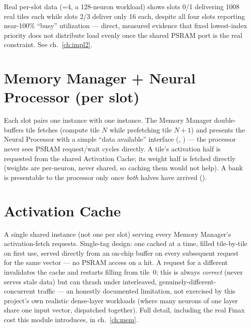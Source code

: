 \begin{fnnote}
Real per-slot data (=4, a 128-neuron workload) shows
slots 0/1 delivering 1008 real tiles each while slots 2/3 deliver only
16 each, despite all four slots reporting near-100\% ``busy''
utilization --- direct, measured evidence that fixed lowest-index
priority does not distribute load evenly once the shared PSRAM port is
the real constraint. See ch.~\ref{ch:impl2}.
\end{fnnote}

\section{Memory Manager + Neural Processor (per slot)}
Each slot pairs one  instance with one
 instance. The Memory Manager double-buffers
tile fetches (compute tile $N$ while prefetching tile $N{+}1$) and
presents the Neural Processor with a simple ``data available''
interface (, ) --- the
processor never sees PSRAM request/wait cycles directly. A tile's
activation half is requested from the shared Activation Cache; its
weight half is fetched directly (weights are per-neuron, never shared,
so caching them would not help). A bank is presentable to the processor
only once \emph{both} halves have arrived
().

\section{Activation Cache}
\label{sec:archcache}
A single shared instance (not one per slot) serving every Memory
Manager's activation-fetch requests. Single-tag design: one cached
 at a time, filled tile-by-tile on first use, served
directly from an on-chip buffer on every subsequent request for the same
vector --- no PSRAM access on a hit. A request for a different
 invalidates the cache and restarts filling from tile~0;
this is always \emph{correct} (never serves stale data) but can thrash
under interleaved, genuinely-different- concurrent
traffic --- an honestly documented limitation, not exercised by this
project's own realistic dense-layer workloads (where many neurons of one
layer share one input vector, dispatched together). Full detail,
including the real Fmax cost this module introduces, in
ch.~\ref{ch:mem}.


